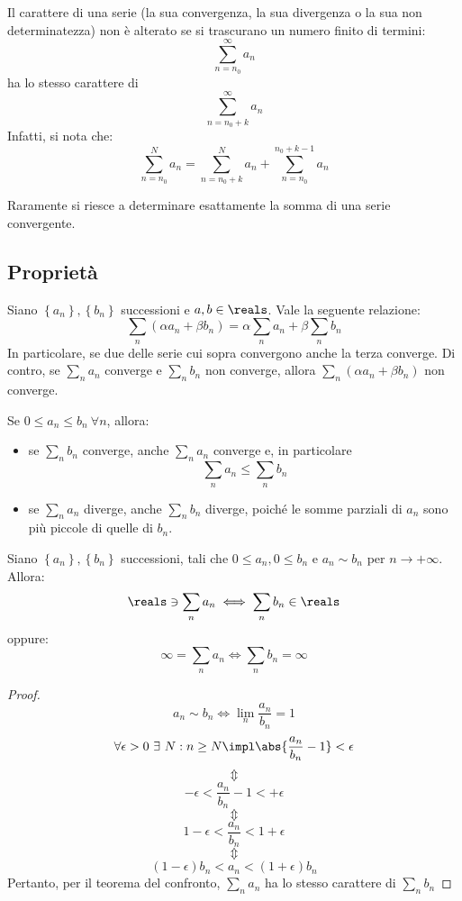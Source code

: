 \begin{observation}
  Il carattere di una serie (la sua convergenza, la sua divergenza o la sua non determinatezza) non è alterato se si trascurano un numero finito di termini:
  $$\sum_{n=n_0}^\infty a_n$$ ha lo stesso carattere di $$\sum_{n=n_0+k}^\infty a_n$$
  Infatti, si nota che:
  $$\sum_{n=n_0}^Na_n=\sum_{n=n_0+k}^Na_n+\sum_{n=n_0}^{n_0+k-1}a_n$$
\end{observation}

\begin{observation}
  Raramente si riesce a determinare esattamente la somma di una serie convergente.
\end{observation}

\subsection{Proprietà}

\begin{theorem}[Linearità]
  Siano $\left\{ a_n \right\},\left\{ b_n \right\}$ successioni e $a,b\in\reals$. Vale la seguente relazione:
  $$\sum_n\left( \alpha a_n+\beta b_n \right)=\alpha\sum_na_n+\beta\sum_nb_n$$
  In particolare, se due delle serie cui sopra convergono anche la terza converge. Di contro, se $\sum_na_n$ converge e $\sum_nb_n$ non converge, allora $\sum_n\left( \alpha a_n+\beta b_n \right)$ non converge.
\end{theorem}

\begin{theorem}[Confronto]
  Se $0\le a_n\le b_n\ \forall n$, allora:
  \begin{itemize}[label=--]
    \item se $\sum_nb_n$ converge, anche $\sum_na_n$ converge e, in particolare $$\sum_na_n\le\sum_nb_n$$
    \item se $\sum_na_n$ diverge, anche $\sum_nb_n$ diverge, poiché le somme parziali di $a_n$ sono più piccole di quelle di $b_n$.
  \end{itemize}
\end{theorem}

\begin{theorem}
  Siano $\left\{ a_n \right\},\left\{ b_n \right\}$ successioni, tali che $0\le a_n,0\le b_n$ e $a_n\sim b_n$ per $n\to+\infty$. Allora:
  $$\reals\ni\sum_na_n\iff \sum_nb_n\in \reals$$
  oppure:
  $$\infty=\sum_na_n\iff\sum_nb_n=\infty$$
\end{theorem}
\begin{proof}
  $$a_n\sim b_n\iff \lim_{n}\frac{a_n}{b_n}=1$$
  $$\forall\epsilon>0\ \exists\ N:n\ge N\impl\abs{\frac{a_n}{b_n}-1}<\epsilon$$
  $$\Updownarrow$$
  $$-\epsilon<\frac{a_n}{b_n}-1<+\epsilon$$
  $$\Updownarrow$$
  $$1-\epsilon<\frac{a_n}{b_n}<1+\epsilon$$
  $$\Updownarrow$$
  $$\left( 1-\epsilon \right)b_n<a_n<\left( 1+\epsilon \right)b_n$$
  Pertanto, per il teorema del confronto, $\sum_na_n$ ha lo stesso carattere di $\sum_nb_n$
\end{proof}

